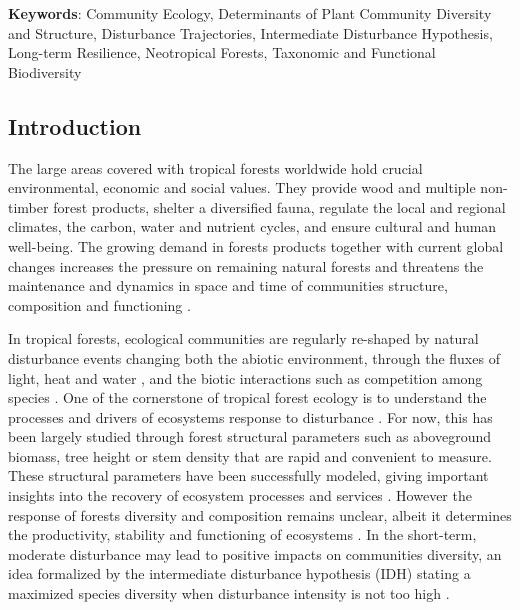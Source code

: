 \documentclass[
  11pt,
  french,
  A4paper,
  extrafontsizes,onecolumn,openright
  ]{memoir}
\begin{document}
\textbf{Keywords}: Community Ecology, Determinants of Plant Community
Diversity and Structure, Disturbance Trajectories, Intermediate
Disturbance Hypothesis, Long-term Resilience, Neotropical Forests,
Taxonomic and Functional Biodiversity

\subsection{Introduction}\label{introduction-1}

The large areas covered with tropical forests worldwide hold crucial
environmental, economic and social values. They provide wood and
multiple non-timber forest products, shelter a diversified fauna,
regulate the local and regional climates, the carbon, water and nutrient
cycles, and ensure cultural and human well-being. The growing demand in
forests products together with current global changes increases the
pressure on remaining natural forests \autocite{Morales-Hidalgo2015} and
threatens the maintenance and dynamics in space and time of communities
structure, composition and functioning \autocite{Anderson-Teixeira2013}.

In tropical forests, ecological communities are regularly re-shaped by
natural disturbance events changing both the abiotic environment,
through the fluxes of light, heat and water
\autocite{Goulamoussene2017}, and the biotic interactions such as
competition among species \autocite{Chesson2000}. One of the cornerstone
of tropical forest ecology is to understand the processes and drivers of
ecosystems response to disturbance \autocite{Chazdon2003a}. For now,
this has been largely studied through forest structural parameters such
as aboveground biomass, tree height or stem density
\autocites{Piponiot2016}{Rutishauser2016} that are rapid and convenient
to measure. These structural parameters have been successfully modeled,
giving important insights into the recovery of ecosystem processes and
services \autocite{Herault2018}. However the response of forests
diversity and composition remains unclear, albeit it determines the
productivity, stability and functioning of ecosystems
\autocites{Tilman2014}{Liang2016}. In the short-term, moderate
disturbance may lead to positive impacts on communities diversity, an
idea formalized by the intermediate disturbance hypothesis (IDH) stating
a maximized species diversity when disturbance intensity is not too high
\autocites{Molino2001}{Kariuki2006a}.
\end{document}
